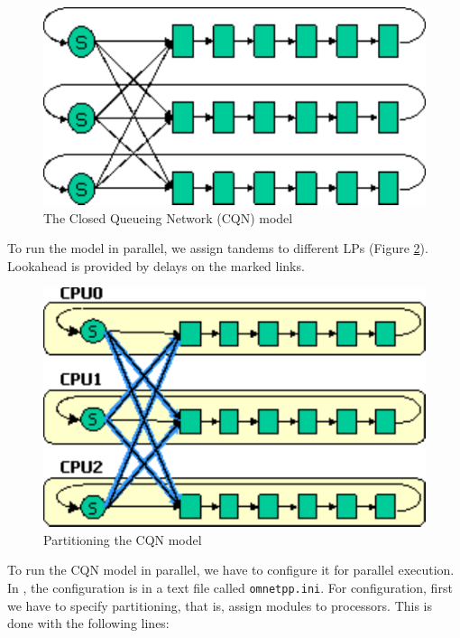 \begin{figure}[htbp]
  \begin{center}
    \includegraphics{figures/cqn-model}
    \caption{The Closed Queueing Network (CQN) model}
    \label{fig:cqn-model}
  \end{center}
\end{figure}

To run the model in parallel, we assign tandems to different LPs
(Figure \ref{fig:cqn-partitioning}). Lookahead is provided
by delays on the marked links.

\begin{figure}[htbp]
  \begin{center}
    \includegraphics{figures/cqn-partitioning}
    \caption{Partitioning the CQN model}
    \label{fig:cqn-partitioning}
  \end{center}
\end{figure}

To run the CQN model in parallel, we have to configure it for parallel
execution. In {\opp}, the configuration is in a text file called
\texttt{omnetpp.ini}. For configuration, first we have to specify
partitioning, that is, assign modules to processors. This is done
with the following lines:

